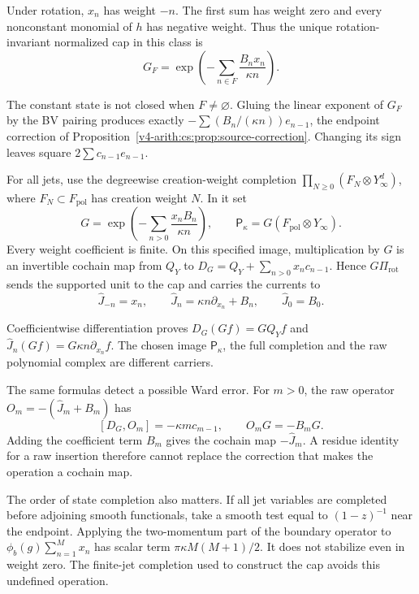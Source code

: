Under rotation, \(x_n\) has weight \(-n\). The first sum has weight zero and
every nonconstant monomial of \(h\) has negative weight. Thus the unique
rotation-invariant normalized cap in this class is
\begin{equation}
 G_F=\exp\left(-\sum_{n\in F}\frac{B_nx_n}{\kappa n}\right).
 \label{v4-arith:cs:eq:cap}
\end{equation}

The constant state is not closed when \(F\ne\varnothing\). Gluing the linear
exponent of \(G_F\) by the BV pairing produces exactly \(-\sum(B_n/(\kappa
n))e_{n-1}\), the endpoint correction of
Proposition~\ref{v4-arith:cs:prop:source-correction}. Changing its sign
leaves square \(2\sum c_{n-1}e_{n-1}\).

For all jets, use the degreewise creation-weight completion
\(\prod_{N\ge0}(F_N\otimes Y_\infty^d)\), where \(F_N\subset
F_{\mathrm{pol}}\) has creation weight \(N\). In it set
\[
 G=\exp\left(-\sum_{n>0}\frac{x_nB_n}{\kappa n}\right),
 \qquad \mathsf P_\kappa=G(F_{\mathrm{pol}}\otimes Y_\infty).
\]
Every weight coefficient is finite. On this specified image, multiplication
by \(G\) is an invertible cochain map from \(Q_Y\) to
\(D_G=Q_Y+\sum_{n>0}x_nc_{n-1}\). Hence \(G\Pi_{\mathrm{rot}}\) sends the
supported unit to the cap and carries the currents to
\[
 \widehat J_{-n}=x_n,\qquad
 \widehat J_n=\kappa n\partial_{x_n}+B_n,\qquad
 \widehat J_0=B_0.
\]

Coefficientwise differentiation proves \(D_G(Gf)=GQ_Yf\) and \(\widehat
J_n(Gf)=G\kappa n\partial_{x_n}f\). The chosen image \(\mathsf P_\kappa\),
the full completion and the raw polynomial complex are different carriers.

The same formulas detect a possible Ward error. For \(m>0\), the raw
operator \(O_m=-(\widehat J_m+B_m)\) has
\[
 [D_G,O_m]=-\kappa m c_{m-1},\qquad
 O_mG=-B_mG.
\]
Adding the coefficient term \(B_m\) gives the cochain map \(-\widehat J_m\).
A residue identity for a raw insertion therefore cannot replace the
correction that makes the operation a cochain map.

The order of state completion also matters. If all jet variables are
completed before adjoining smooth functionals, take a smooth test equal to
\((1-z)^{-1}\) near the endpoint. Applying the two-momentum part of the
boundary operator to \(\phi_b(g)\sum_{n=1}^Mx_n\) has scalar term
\(\pi\kappa M(M+1)/2\). It does not stabilize even in weight zero. The
finite-jet completion used to construct the cap avoids this undefined
operation.

